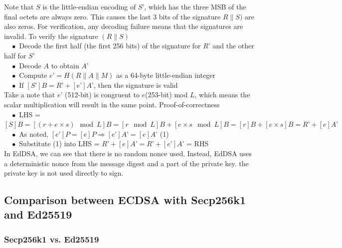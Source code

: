 Note that $S$ is the little-endian encoding of $S’$, which has the three MSB of the final octets are always zero. This causes the last 3 bits of the signature $R \| S)$ are also zeros. For verification, any decoding failure means that the signatures are invalid. To verify the signature $(R \| S)$\\

\hspace{0.2cm} $\quad\bullet$ Decode the first half (the first 256 bits) of the signature for $R’$ and the other half for $S’$\\
$\quad\bullet$ Decode $A$ to obtain $A’$\\
$\quad\bullet$ Compute $e’ = H(R\|A\|M)$ as a 64-byte little-endian integer\\
$\quad\bullet$ If $[S’]B = R’ + [e’]A’$, then the signature is valid\\

Take a note that $e’$ (512-bit) is congruent to $e$(253-bit) mod $L$, which means the scalar multiplication will result in the same point. Proof-of-correctness\\

\hspace{0.2cm}
$\quad\bullet$ LHS = $[S]B = [(r +e \times s) \mod L]B = [r \mod L]B + [e \times s \mod L]B = [r]B + [e \times s]B = R’ + [e]A’$\\
$\quad\bullet$ As noted, $[e’]P = [e]P \Rightarrow [e’]A’ = [e]A’$ (1)\\
$\quad\bullet$ Substitute (1) into LHS = $R’ + [e]A’ = R’ + [e’]A’$ = RHS\\

In EdDSA, we can see that there is no random nonce used. Instead, EdDSA uses a deterministic nonce from the message digest and a part of the private key. the private key is not used directly to sign.\\

\subsection{Comparison between ECDSA with Secp256k1 and Ed25519}

\subsubsection{Secp256k1 vs. Ed25519}

